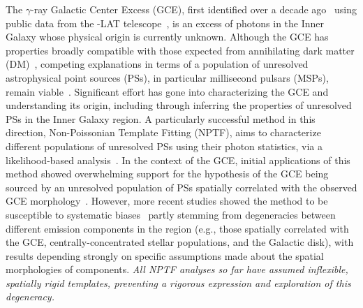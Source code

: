 \documentclass[prd,aps,10pt,nofootinbib,twocolumn,superscriptaddress,preprintnumbers,balancelastpage,longbibliography,floatfix]{revtex4-2}
\begin{document}
The $\gamma$-ray Galactic Center Excess (GCE), first identified over a decade ago~\cite{Goodenough:2009gk} using public data from the \Fermi-LAT telescope~\cite{Atwood:2009ez}, is an excess of photons in the Inner Galaxy whose physical origin is currently unknown. Although the GCE has properties broadly compatible with those expected from annihilating dark matter (DM)~\cite{Goodenough:2009gk,Hooper:2010mq,Daylan:2014rsa,Calore:2014xka,Fermi-LAT:2015sau}, competing explanations in terms of a population of unresolved astrophysical point sources (PSs), in particular millisecond pulsars (MSPs), remain viable~\cite{Abazajian:2014fta,Abazajian:2010zy}. Significant effort has gone into characterizing the GCE and understanding its origin, including through inferring the properties of unresolved PSs in the Inner Galaxy region. A particularly successful method in this direction, Non-Poissonian Template Fitting (NPTF), aims to characterize different populations of unresolved PSs using their photon statistics, via a likelihood-based analysis~\cite{Lee:2014mza,Lee:2015fea}. In the context of the GCE, initial applications of this method showed overwhelming support for the hypothesis of the GCE being sourced by an unresolved population of PSs spatially correlated with the observed GCE morphology~\cite{Lee:2015fea}. However, more recent studies showed the method to be susceptible to systematic biases~\cite{Leane:2019xiy,Leane:2020nmi,Leane:2020pfc,Chang:2019ars} partly stemming from degeneracies between different emission components in the region (e.g., those spatially correlated with the GCE, centrally-concentrated stellar populations, and the Galactic disk), with results depending strongly on specific assumptions made about the spatial morphologies of components. \emph{All NPTF analyses so far have assumed inflexible, spatially rigid templates, preventing a rigorous expression and exploration of this degeneracy.}
\vspace{0.05in}
\end{document}
